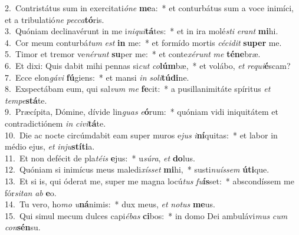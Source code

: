 {2.~}Contristátus sum in exercitati\textit{ó}\textit{ne} \textbf{me}a:~* et conturbátus sum a voce inimíci, et a tribulatió\textit{ne} \textit{pec}\textit{ca}\textbf{tó}ris.\\
{3.~}Quóniam declinavérunt in me i\textit{ni}\textit{qui}\textbf{tá}tes:~* et in ira molé\textit{sti} \textit{e}\textit{rant} \textbf{mi}hi.\\
{4.~}Cor meum conturbá\textit{tum} \textit{est} \textbf{in} me:~* et formído mortis \textit{cé}\textit{ci}\textit{dit} \textbf{su}\textbf{per} me.\\
{5.~}Timor et tremor ve\textit{né}\textit{runt} \textbf{su}per me:~* et conte\textit{xé}\textit{runt} \textit{me} \textbf{té}\textbf{ne}bræ.\\
{6.~}Et dixi: Quis dabit mihi pennas si\textit{cut} \textit{co}\textbf{lúm}bæ,~* et volábo, \textit{et} \textit{re}\textit{qui}\textbf{é}scam?\\
{7.~}Ecce elon\textit{gá}\textit{vi} \textbf{fú}giens:~* et mansi \textit{in} \textit{so}\textit{li}\textbf{tú}\textbf{di}ne.\\
{8.~}Exspectábam eum, qui sal\textit{vum} \textit{me} \textbf{fe}cit:~* a pusillanimitáte spíritus \textit{et} \textit{tem}\textit{pe}\textbf{stá}te.\\
{9.~}Præcípita, Dómine, dívide lin\textit{guas} \textit{e}\textbf{ó}rum:~* quóniam vidi iniquitátem et contradictiónem \textit{in} \textit{ci}\textit{vi}\textbf{tá}te.\\
{10.~}Die ac nocte circúmdabit eam super muros e\textit{jus} \textit{i}\textbf{ní}quitas:~* et labor in médio ejus, \textit{et} \textit{in}\textit{ju}\textbf{stí}\textbf{ti}a.\\
{11.~}Et non defécit de pla\textit{té}\textit{is} \textbf{e}jus:~* u\textit{sú}\textit{ra}, \textit{et} \textbf{do}lus.\\
{12.~}Quóniam si inimícus meus maledi\textit{xís}\textit{set} \textbf{mi}hi,~* susti\textit{nu}\textit{ís}\textit{sem} \textbf{ú}\textbf{ti}que.\\
{13.~}Et si is, qui óderat me, super me magna locú\textit{tus} \textit{fu}\textbf{ís}set:~* abscondíssem me fór\textit{si}\textit{tan} \textit{ab} \textbf{e}o.\\
{14.~}Tu vero, ho\textit{mo} \textit{u}\textbf{ná}nimis:~* dux meus, \textit{et} \textit{no}\textit{tus} \textbf{me}us.\\
{15.~}Qui simul mecum dulces capi\textit{é}\textit{bas} \textbf{ci}bos:~* in domo Dei ambulávi\textit{mus} \textit{cum} \textit{con}\textbf{sén}su.\\
